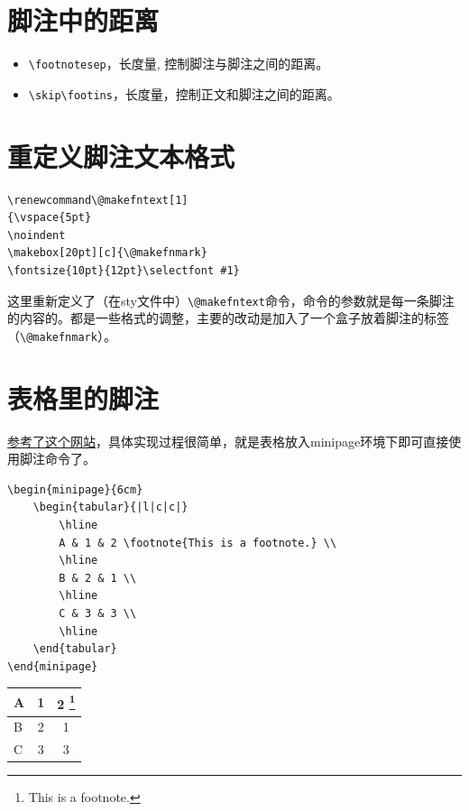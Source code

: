 \documentclass[11pt,oneside]{book}
\begin{document}
\section{脚注中的距离}
\begin{itemize}
\item \verb+\footnotesep+，长度量, 控制脚注与脚注之间的距离。
\item \verb+\skip\footins+，长度量，控制正文和脚注之间的距离。
\end{itemize}


\section{重定义脚注文本格式}
\begin{Verbatim}
\renewcommand\@makefntext[1]
{\vspace{5pt}
\noindent
\makebox[20pt][c]{\@makefnmark}
\fontsize{10pt}{12pt}\selectfont #1}
\end{Verbatim}

这里重新定义了（在sty文件中）\verb+\@makefntext+命令，命令的参数就是每一条脚注的内容的。都是一些格式的调整，主要的改动是加入了一个盒子放着脚注的标签（\verb+\@makefnmark+）。


\section{表格里的脚注}
\href{http://texblog.org/tag/footnote/}{参考了这个网站}，具体实现过程很简单，就是表格放入minipage环境下即可直接使用脚注命令了。

\begin{Verbatim}
\begin{minipage}{6cm}
	\begin{tabular}{|l|c|c|}
		\hline
		A & 1 & 2 \footnote{This is a footnote.} \\
		\hline
		B & 2 & 1 \\
		\hline
		C & 3 & 3 \\
		\hline
	\end{tabular}
\end{minipage}
\end{Verbatim}


\begin{minipage}{6cm}
	\begin{tabular}{|l|c|c|}
		\hline
		A & 1 & 2 \footnote{This is a footnote.} \\
		\hline
		B & 2 & 1 \\
		\hline
		C & 3 & 3 \\
		\hline
	\end{tabular}
\end{minipage}
\end{document}
